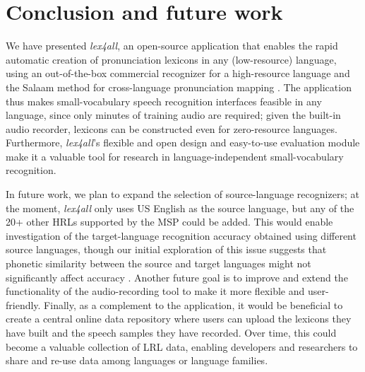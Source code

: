 \documentclass[11pt]{article}
\begin{document}
\section{Conclusion and future work}
\label{sec:future}

We have presented \textit{lex4all}, an open-source application that enables the rapid automatic creation of pronunciation lexicons in any (low-resource) language, using an out-of-the-box commercial recognizer 
for a high-resource language and the Salaam method for cross-language pronunciation mapping \cite{Qiao10,Chan12}. The application thus makes small-vocabulary speech recognition interfaces feasible in any language, since 
only minutes of training audio 
are required; 
given the built-in audio recorder, lexicons can be constructed even for zero-resource languages. 
Furthermore, \textit{lex4all}'s flexible and open design and easy-to-use evaluation module
make it a valuable tool for
research in language-independent small-vocabulary recognition.

In future work, we plan 
to expand the selection of source-language recognizers; at the moment, \textit{lex4all} only uses US English as the source language, but any of the 20+ other HRLs supported by the MSP could be added.
This would enable investigation of the target-language recognition accuracy obtained using different source languages, though our initial exploration of this issue suggests that phonetic similarity between the source and target languages might not significantly affect accuracy \cite{vakil14}. 
Another future goal is to improve and extend the functionality of the audio-recording tool 
to make it more flexible and user-friendly.
Finally, as a complement to the application, it would be beneficial to 
create a central online data repository where users can 
upload the lexicons they have built and the speech samples they have recorded. %
Over time, this could become a valuable collection of LRL data, enabling developers and researchers to share and re-use data among languages or language families.
\end{document}

